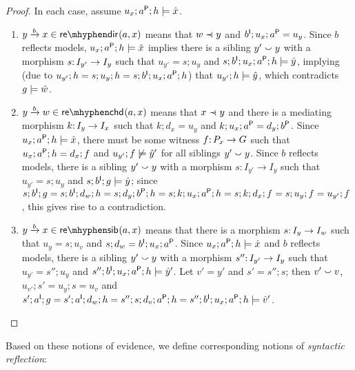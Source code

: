 \begin{proof}
In each case, assume $u_x;a\P;h\sat \hat x$.
\begin{enumerate}
\item $\trip ybx\in \sdir{a,x}$ means that $w\parentof y$ and $b\I;u_x;a\P=u_y$. Since $b$ reflects models, $u_x;a\P;h\sat \hat x$ implies there is a sibling $y'\sibling y$ with a morphism $s\of I_{y'}\to I_y$ such that $u_{y'}=s;u_y$ and $s;b\I;u_x;a\P;h\sat \hat y$, implying (due to $u_{y'};h=s;u_y;h=s;b\I;u_x;a\P;h$) that $u_{y'};h\sat \hat y$, which contradicts $g\sat \hat w$.

\item $\trip ybw\in \schd{a,x}$ means that $x\parentof y$ and there is a mediating morphism $k\of I_y\to I_x$ such that $k;d_x=u_y$ and $k;u_x;a\P=d_y;b\P$. Since $u_x;a\P;h\sat \hat x$, there must be some witness $f\of P_x\to G$ such that $u_x;a\P;h=d_x;f$ and $u_{y'};f\nsat \hat y'$ for all siblings $y'\sibling y$. Since $b$ reflects models, there is a sibling $y'\sibling y$ with a morphism $s:I_{y'}\to I_y$ such that $u_{y'}=s;u_y$ and $s;b\I;g\sat \hat y$; since $s;b\I;g= s;b\I;d_w;h= s;d_y;b\P;h= s;k;u_x;a\P;h=s;k;d_x;f=s;u_y;f=u_{y'};f$, this gives rise to a contradiction.

\item $\trip ybx\in \ssib{a,x}$ means that there is a morphism $s\of I_y\to I_w$ such that $u_y=s;u_v$ and $s;d_w=b\I;u_x;a\P$. Since $u_x;a\P;h\sat \hat x$ and $b$ reflects models, there is a sibling $y'\sibling y$ with a morphism $s''\of I_{y'}\to I_y$ such that $u_{y'}=s'';u_y$ and $s'';b\I;u_x;a\P;h\sat \hat y'$. Let $v'=y'$ and $s'=s'';s$; then $v'\sibling v$, $u_{v'};s'=u_y;s=u_v$ and $s';a\I;g= s';a\I;d_w;h= s'';s;d_v;a\P;h= s'';b\I;u_x;a\P;h \sat \hat v'$.
\end{enumerate}
\end{proof}
%
Based on these notions of evidence, we define corresponding notions of \emph{syntactic reflection}:

